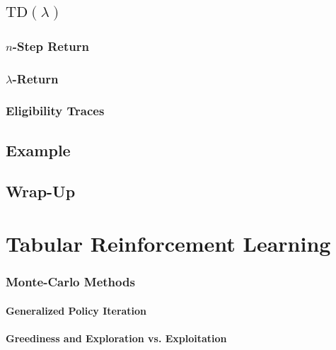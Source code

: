 	\section{\( \text{TD}(\lambda) \)} %

		\subsection{\(n\)-Step Return} %

		\subsection{\(\lambda\)-Return} %

		\subsection{Eligibility Traces} %

	\section{Example} %

	\section{Wrap-Up} %

\chapter{Tabular Reinforcement Learning} %

		\subsection{Monte-Carlo Methods} %

			\subsubsection{Generalized Policy Iteration} %

			\subsubsection{Greediness and Exploration vs. Exploitation} %

